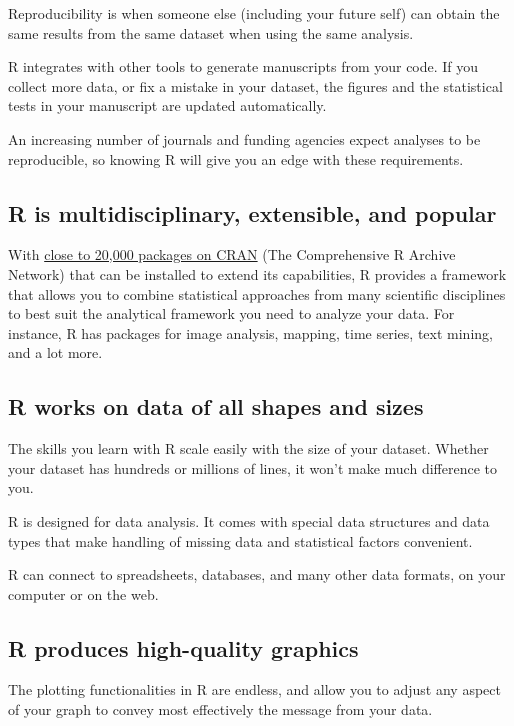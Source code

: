 \documentclass[
]{book}
\begin{document}
Reproducibility is when someone else (including your future self) can obtain the
same results from the same dataset when using the same analysis.

R integrates with other tools to generate manuscripts from your code. If you
collect more data, or fix a mistake in your dataset, the figures and the
statistical tests in your manuscript are updated automatically.

An increasing number of journals and funding agencies expect analyses to be
reproducible, so knowing R will give you an edge with these requirements.

\subsection{R is multidisciplinary, extensible, and popular}\label{r-is-multidisciplinary-extensible-and-popular}

With \href{https://cran.r-project.org/web/packages}{close to 20,000 packages on CRAN} (The Comprehensive R Archive Network) that can be installed to extend its capabilities, R
provides a framework that allows you to combine statistical approaches from many
scientific disciplines to best suit the analytical framework you need to analyze your
data. For instance, R has packages for image analysis, mapping, time series, text mining, and a lot more.

\subsection{R works on data of all shapes and sizes}\label{r-works-on-data-of-all-shapes-and-sizes}

The skills you learn with R scale easily with the size of your dataset. Whether
your dataset has hundreds or millions of lines, it won't make much difference to
you.

R is designed for data analysis. It comes with special data structures and data
types that make handling of missing data and statistical factors convenient.

R can connect to spreadsheets, databases, and many other data formats, on your
computer or on the web.

\subsection{R produces high-quality graphics}\label{r-produces-high-quality-graphics}

The plotting functionalities in R are endless, and allow you to adjust any
aspect of your graph to convey most effectively the message from your data.
\end{document}
